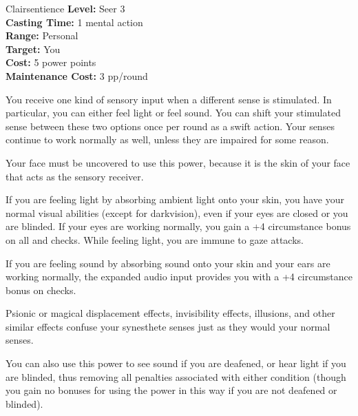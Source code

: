{Clairsentience}
{
	\textbf{Level:}
	Seer 3\\
	\textbf{Casting Time:}
	1 mental action\\
	\textbf{Range:}
	Personal\\
	\textbf{Target:}
	You\\
	\textbf{Cost:}
	5 power points\\
	\textbf{Maintenance Cost:}
	3 pp/round\\
}
{
	You receive one kind of sensory input when a different sense is stimulated. In particular, you can either feel light or feel sound. You can shift your stimulated sense between these two options once per round as a swift action. Your senses continue to work normally as well, unless they are impaired for some reason.

	Your face must be uncovered to use this power, because it is the skin of your face that acts as the sensory receiver.

	If you are feeling light by absorbing ambient light onto your skin, you have your normal visual abilities (except for darkvision), even if your eyes are closed or you are blinded. If your eyes are working normally, you gain a +4 circumstance bonus on all  and  checks. While feeling light, you are immune to gaze attacks.

	If you are feeling sound by absorbing sound onto your skin and your ears are working normally, the expanded audio input provides you with a +4 circumstance bonus on  checks.

	Psionic or magical displacement effects, invisibility effects, illusions, and other similar effects confuse your synesthete senses just as they would your normal senses.

	You can also use this power to see sound if you are deafened, or hear light if you are blinded, thus removing all penalties associated with either condition (though you gain no bonuses for using the power in this way if you are not deafened or blinded).
}